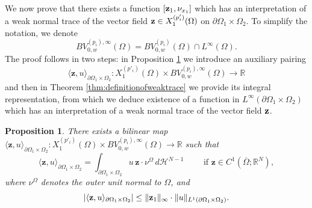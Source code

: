\documentclass[reqno,12pt]{amsart}
\def\z{{\bf z}}
\newtheorem{proposition}[theorem]{Proposition}
\numberwithin{equation}{section}
\begin{document}
We now prove that there exists a function $[\z_1, \nu_{x_1}]$ which has an interpretation of a weak normal trace of the vector field $\z \in X_1^{(p'_i)}(\Omega)$ on $\partial \Omega_1 \times \Omega_2$. To simplify the notation, we denote
$$ BV_{0,w}^{(p_i), \infty}(\Omega) = BV_{0,w}^{(p_i)}(\Omega) \cap L^\infty(\Omega).$$
The proof follows in two steps: in Proposition \ref{prop:bilinearform} we introduce an auxiliary pairing
$$ \langle \mathbf{z}, u \rangle_{\partial\Omega_1 \times \Omega_2}: X_1^{(p'_i)}(\Omega) \times BV_{0,w}^{(p_i), \infty}(\Omega) \rightarrow \mathbb{R}$$
and then in Theorem \ref{thm:definitionofweaktrace} we provide its integral representation, from which we deduce existence of a function in $L^\infty(\partial\Omega_1 \times \Omega_2)$ which has an interpretation of a weak normal trace of the vector field $\z$.

\begin{proposition}\label{prop:bilinearform}
There exists a bilinear map $\langle \mathbf{z}, u \rangle_{\partial\Omega_1 \times \Omega_2}: X_1^{(p'_i)}(\Omega) \times BV_{0,w}^{(p_i), \infty}(\Omega) \rightarrow \mathbb{R}$ such that
$$ \langle \mathbf{z}, u \rangle_{\partial\Omega_1 \times \Omega_2} = \int_{\partial\Omega_1 \times \Omega_2} u \, \mathbf{z} \cdot \nu^\Omega \, d\mathcal{H}^{N-1} \qquad \mbox{ if } \mathbf{z} \in C^1(\overline{\Omega}; \mathbb{R}^N),$$
where $\nu^\Omega$ denotes the outer unit normal to $\Omega$, and
$$ |\langle \mathbf{z}, u \rangle_{\partial\Omega_1 \times \Omega_2}| \leq \| \z_1 \|_{\infty} \cdot \| u \|_{L^1(\partial\Omega_1 \times \Omega_2)}.$$
\end{proposition}
\end{document}
